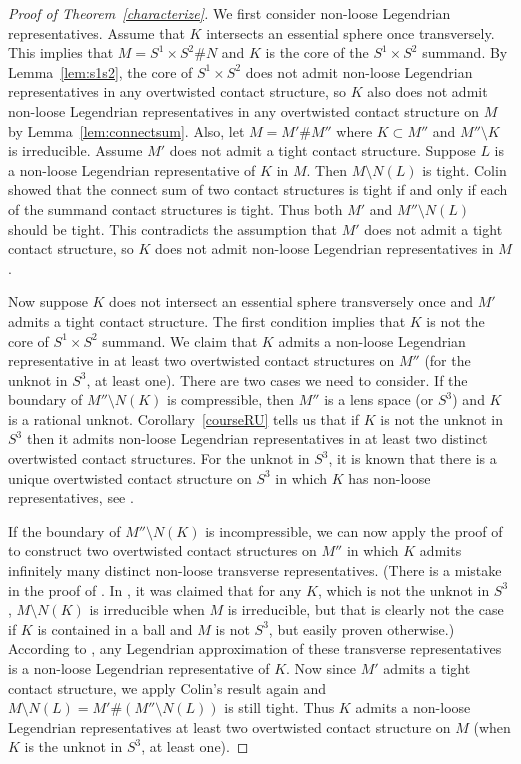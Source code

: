 \documentclass[11pt]{amsart}
\theoremstyle{plain}
\theoremstyle{definition}
\theoremstyle{remark}
\numberwithin{theorem}{section}
\begin{document}
\begin{proof}[Proof of Theorem~\ref{characterize}]
  We first consider non-loose Legendrian representatives. Assume that $K$ intersects an essential sphere once transversely. This implies that $M = S^1\times S^2 \# N$ and $K$ is the core of the $S^1 \times S^2$ summand. By Lemma~\ref{lem:s1s2}, the core of $S^1 \times S^2$ does not admit non-loose Legendrian representatives in any overtwisted contact structure, so $K$ also does not admit non-loose Legendrian representatives in any overtwisted contact structure on $M$ by Lemma~\ref{lem:connectsum}. Also, let $M = M' \# M''$ where $K \subset M''$ and $M'' \setminus K$ is irreducible. Assume $M'$ does not admit a tight contact structure. Suppose $L$ is a non-loose Legendrian representative of $K$ in $M$. Then $M \setminus N(L)$ is tight. Colin \cite{Colin97} showed that the connect sum of two contact structures is tight if and only if each of the summand contact structures is tight. Thus both $M'$ and $M'' \setminus N(L)$ should be tight. This contradicts the assumption that $M'$ does not admit a tight contact structure, so $K$ does not admit non-loose Legendrian representatives in $M$. 

  Now suppose $K$ does not intersect an essential sphere transversely once and $M'$ admits a tight contact structure. The first condition implies that $K$ is not the core of $S^1 \times S^2$ summand. We claim that $K$ admits a non-loose Legendrian representative in at least two overtwisted contact structures on $M''$ (for the unknot in $S^3$, at least one). There are two cases we need to consider. If the boundary of $M'' \setminus N(K)$ is compressible, then  $M''$ is a lens space (or $S^3$) and $K$ is a rational unknot. Corollary~\ref{courseRU} tells us that if $K$ is not the unknot in $S^3$ then it admits non-loose Legendrian representatives in at least two distinct overtwisted contact structures. For the unknot in $S^3$, it is known that there is a unique overtwisted contact structure on $S^3$ in which $K$ has non-loose representatives, see \cite{EliashbergFraser09}. 
  
  If the boundary of $M'' \setminus N(K)$ is incompressible, we can now apply the proof of \cite[Theorem~1.8]{Etnyre13} to construct two overtwisted contact structures on $M''$ in which $K$ admits infinitely many distinct non-loose transverse representatives. (There is a mistake in the proof of \cite[Theorem~1.8]{Etnyre13}. In \cite{Etnyre13}, it was claimed that for any $K$, which is not the unknot in $S^3$, $M\setminus N(K)$ is irreducible when $M$ is irreducible, but that is clearly not the case if $K$ is contained in a ball and $M$ is not $S^3$, but easily proven otherwise.) According to \cite[Proposition~1.2]{Etnyre13}, any Legendrian approximation of these transverse representatives is a non-loose Legendrian representative of $K$.  Now since $M'$ admits a tight contact structure, we apply Colin's result \cite{Colin97} again and $M \setminus N(L) = M' \# (M'' \setminus N(L))$ is still tight. Thus $K$ admits a non-loose Legendrian representatives at least two overtwisted contact structure on $M$ (when $K$ is the unknot in $S^3$, at least one).
 

\end{proof}
\end{document}
